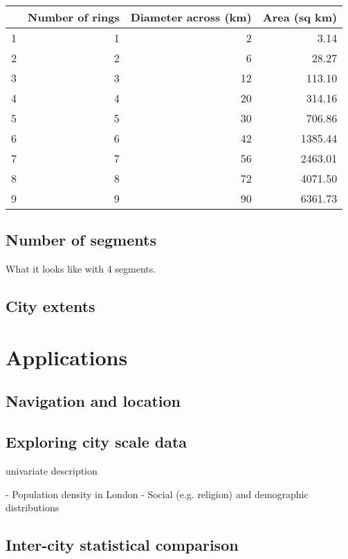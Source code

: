 \documentclass{josis}
\begin{document}
\begin{table}
\centering
\begin{tabular}{rrrr}
  \hline
 & Number of rings & Diameter across (km) & Area (sq km) \\ 
  \hline
1 &   1 & 2 & 3.14 \\ 
  2 &   2 & 6 & 28.27 \\ 
  3 &   3 & 12 & 113.10 \\ 
  4 &   4 & 20 & 314.16 \\ 
  5 &   5 & 30 & 706.86 \\ 
  6 &   6 & 42 & 1385.44 \\ 
  7 &   7 & 56 & 2463.01 \\ 
  8 &   8 & 72 & 4071.50 \\ 
  9 &   9 & 90 & 6361.73 \\ 
   \hline
\end{tabular}
\end{table}


\subsection{Number of segments}

What it looks like with 4 segments.

\subsection{City extents}

\section{Applications}

\subsection{Navigation and location}


\subsection{Exploring city scale data}
univariate description

- Population density in London
- Social (e.g. religion) and demographic distributions

\subsection{Inter-city statistical comparison}
\end{document}
